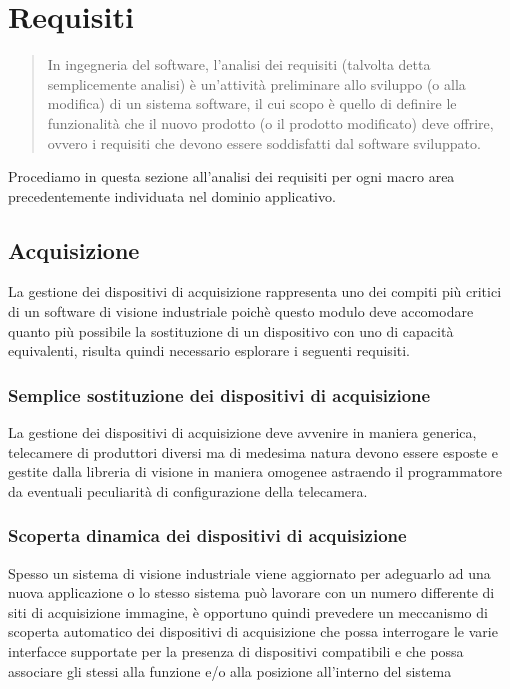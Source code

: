 \section{Requisiti}
\label{sec:requisiti}

\begin{quote}
\small
In ingegneria del software, l'analisi dei requisiti (talvolta detta semplicemente analisi) è un'attività preliminare allo sviluppo (o alla modifica) di un sistema software, il cui scopo è quello di definire le funzionalità che il nuovo prodotto (o il prodotto modificato) deve offrire, ovvero i requisiti che devono essere soddisfatti dal software sviluppato.
\end{quote}

Procediamo in questa sezione all'analisi dei requisiti per ogni macro area precedentemente individuata nel dominio applicativo.

\subsection{Acquisizione}
La gestione dei dispositivi di acquisizione rappresenta uno dei compiti più critici di un software di visione industriale poichè
questo modulo deve accomodare quanto più possibile la sostituzione di un dispositivo con uno di capacità equivalenti, risulta quindi necessario esplorare i seguenti requisiti.

\subsubsection{Semplice sostituzione dei dispositivi di acquisizione}
La gestione dei dispositivi di acquisizione deve avvenire in maniera generica, telecamere di produttori diversi ma di medesima natura devono essere esposte e gestite dalla libreria di visione in maniera omogenee astraendo il programmatore da eventuali peculiarità di configurazione della telecamera.
\subsubsection{Scoperta dinamica dei dispositivi di acquisizione}
Spesso un sistema di visione industriale viene aggiornato per adeguarlo ad una nuova applicazione o lo stesso sistema può lavorare con un numero differente di siti di acquisizione immagine, è opportuno quindi prevedere un meccanismo di scoperta automatico dei dispositivi di acquisizione che possa interrogare le varie interfacce supportate per la presenza di dispositivi compatibili e che possa associare gli stessi alla funzione e/o alla posizione all'interno del sistema
